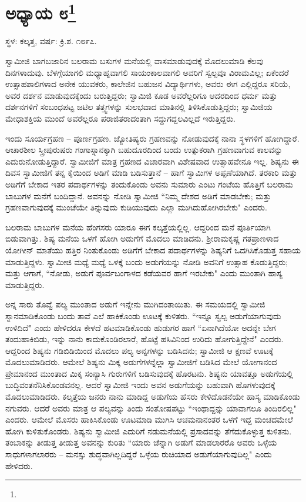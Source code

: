 \newpage

\chapter[ಅಧ್ಯಾಯ ೮]{ಅಧ್ಯಾಯ ೮\protect\footnote{}}

\centerline{ಸ್ಥಳ: ಕಲ್ಕತ್ತ, ವರ್ಷ: ಕ್ರಿ.ಶ. ೧೮೯೭.}

ಸ್ವಾಮೀಜಿ ಬಾಗಬಜಾರಿನ ಬಲರಾಮ ಬಸುಗಳ ಮನೆಯಲ್ಲಿ ವಾಸಮಾಡುವುದಕ್ಕೆ ಮೊದಲುಮಾಡಿ ಕೆಲವು ದಿನಗಳಾದುವು. ಬೆಳಗ್ಗೆಯಾಗಲಿ ಮಧ್ಯಾಹ್ನವಾಗಲಿ ಸಾಯಂಕಾಲವಾಗಲಿ ಅವರಿಗೆ ಸ್ವಲ್ಪವೂ ವಿರಾಮವಿಲ್ಲ; ಏಕೆಂದರೆ ಉತ್ಸಾಹಶಾಲಿಗಳಾದ ಅನೇಕ ಯುವಕರು, ಕಾಲೇಜಿನ ಬಹುಜನ ವಿದ್ಯಾರ್ಥಿಗಳು, ಅವರು ಈಗ ಎಲ್ಲಿದ್ದರೂ ಸರಿಯೆ, ಅವರ ದರ್ಶನ ಮಾಡುವುದಕ್ಕೆಂದು ಬರುತ್ತಿದ್ದರು; ಸ್ವಾಮಿಜಿ ಕೂಡ ಅವರೆಲ್ಲರಿಗೂ ಆದರದಿಂದ ಧರ್ಮ ಮತ್ತು ದರ್ಶನಗಳಿಗೆ ಸಂಬಂಧಪಟ್ಟ ಜಟಿಲ ತತ್ತ್ವಗಳನ್ನು ಸುಲಭವಾದ ಮಾತಿನಲ್ಲಿ ತಿಳಿಸಿಕೊಡುತ್ತಿದ್ದರು; ಸ್ವಾಮಿಜಿಯ ಮೇಧಾಶಕ್ತಿಯ ಮುಂದೆ ಅವರೆಲ್ಲರೂ ಪರಾಜಿತರಾದಂತಾಗಿ ಸದ್ದುಗದ್ದಲವಿಲ್ಲದೆ ಇರುತ್ತಿದ್ದರು.

ಇಂದು ಸೂರ್ಯಗ್ರಹಣ – ಪೂರ್ಣಗ್ರಹಣ. ಜ್ಯೋತಿಷ್ಯರು ಗ್ರಹಣವನ್ನು ನೋಡುವುದಕ್ಕೆ ನಾನಾ ಸ್ಥಳಗಳಿಗೆ ಹೋಗಿದ್ದಾರೆ. ಆಚಾರಶೀಲ ಸ್ತ್ರೀಪುರುಷರು ಗಂಗಾಸ್ನಾನಕ್ಕಾಗಿ ಬಹುದೂರದಿಂದ ಬಂದು ಉತ್ಸುಕರಾಗಿ ಗ್ರಹಣವಾಗುವ ಕಾಲವನ್ನು ಎದುರುನೋಡುತ್ತಿದ್ದಾರೆ. ಸ್ವಾಮೀಜಿಗೆ ಮಾತ್ರ ಗ್ರಹಣದ ವಿಚಾರವಾಗಿ ವಿಶೇಷವಾದ ಉತ್ಸಾಹವೇನೂ ಇಲ್ಲ. ಶಿಷ್ಯನು ಈ ದಿವಸ ಸ್ವಾಮೀಜಿಗೆ ತನ್ನ ಕೈಯಿಂದ ಅಡಿಗೆ ಮಾಡಿ ಬಡಿಸುತ್ತಾನೆ – ಹಾಗೆ ಸ್ವಾಮಿಗಳ ಅಪ್ಪಣೆಯಾಗಿದೆ. ತರಕಾರಿ ಮತ್ತು ಅಡಿಗೆಗೆ ಬೇಕಾದ ಇತರ ಪದಾರ್ಥಗಳನ್ನು ತಂದುಕೊಂಡು ಅವನು ಸುಮಾರು ಎಂಟು ಗಂಟೆಯ ಹೊತ್ತಿಗೆ ಬಲರಾಮ ಬಾಬುಗಳ ಮನೆಗೆ ಬಂದಿದ್ದಾನೆ. ಅವನನ್ನು ನೋಡಿ ಸ್ವಾಮೀಜಿ “ನಿಮ್ಮ ದೇಶದ ಅಡಿಗೆ ಮಾಡಬೇಕು; ಮತ್ತು ಗ್ರಹಣವಾಗುವುದಕ್ಕೆ ಮುಂಚೆಯೇ ತಿನ್ನುವುದು ಕುಡಿಯುವುದು ಎಲ್ಲಾ ಮುಗಿದುಹೋಗಿರಬೇಕು" ಎಂದರು.

ಬಲರಾಮ ಬಾಬುಗಳ ಮನೆಯ ಹೆಂಗಸರು ಯಾರೂ ಈಗ ಕಲ್ಕತ್ತೆಯಲ್ಲಿಲ್ಲ. ಆದ್ದರಿಂದ ಮನೆ ಪೂರ್ತಿಯಾಗಿ ಬಿಡುವಾಗಿತ್ತು. ಶಿಷ್ಯ ಮನೆಯ ಒಳಗೆ ಹೋಗಿ ಅಡುಗೆಗೆ ಮೊದಲು ಮಾಡಿದನು. ಶ‍್ರೀರಾಮಕೃಷ್ಣ ಗತಪ್ರಾಣಳಾದ ಯೋಗೀನ್ ಮಾತೆಯು ಹತ್ತಿರ ನಿಂತುಕೊಂಡು ಅಡಿಗೆಗೆ ಬೇಕಾದ ಪದಾರ್ಥಗಳನ್ನು ಶಿಷ್ಯನಿಗೆ ಒದಗಿಸಿಕೊಡುತ್ತ ಸಹಾಯ ಮಾಡುತ್ತಿದ್ದಳು. ಸ್ವಾಮೀಜಿ ಮಧ್ಯೆ ಮಧ್ಯೆ ಒಳಕ್ಕೆ ಬಂದು ಅಡುಗೆಯನ್ನು ನೋಡಿ ಅವನಿಗೆ ಉತ್ಸಾಹ ಕೊಡುತ್ತಿದ್ದರು; ಮತ್ತು ಆಗಾಗೆ, “ನೋಡು, ಅಡುಗೆ ಪೂರ್ವಬಂಗಾಳದ ಕಡೆಯವರ ಹಾಗೆ ಇರಬೇಕು" ಎಂದು ಮುಂತಾಗಿ ಹಾಸ್ಯ ಮಾಡುತ್ತಿದ್ದರು.

ಅನ್ನ ಸಾರು ತೊವ್ವೆ ಪಲ್ಯ ಮುಂತಾದ ಅಡುಗೆ ಇನ್ನೇನು ಮುಗಿದಂತಾಯಿತು. ಈ ಸಮಯದಲ್ಲಿ ಸ್ವಾಮೀಜಿ ಸ್ನಾನಮಾಡಿಕೊಂಡು ಬಂದು ತಾವೆ ಎಲೆ ಹಾಕಿಕೊಂಡು ಊಟಕ್ಕೆ ಕುಳಿತರು. “ಇನ್ನೂ ಸ್ವಲ್ಪ ಅಡುಗೆಯಾಗುವುದು ಉಳಿದಿದೆ" ಎಂದು ಹೇಳಿದರೂ ಕೇಳದೆ ಹಟಮಾಡಿಕೊಂಡು ಹುಡುಗರ ಹಾಗೆ “ಏನಾಗಿದೆಯೋ ಅದನ್ನೇ ಬೇಗ ತಂದುಹಾಕಿಬಿಡು, ಇನ್ನು ನಾನು ಕಾದುಕೊಂಡಿರಲಾರೆ, ಹೊಟ್ಟೆ ಹಸಿವಿನಿಂದ ಉರಿದು ಹೋಗುತ್ತಿದ್ದೇನೆ" ಎಂದರು. ಆದ್ದರಿಂದ ಶಿಷ್ಯನು ಗಡಿಬಿಡಿಯಿಂದ ಮೊದಲು ಪಲ್ಯ ಅನ್ನಗಳನ್ನು ಬಡಿಸಿದನು; ಸ್ವಾಮೀಜಿ ಆ ಕ್ಷಣವೆ ಊಟಕ್ಕೆ ಮೊದಲುಮಾಡಿದರು. ಆಮೇಲೆ ಶಿಷ್ಯನು ಮಿಕ್ಕ ಅಡುಗೆಗಳನ್ನೆಲ್ಲಾ ಸ್ವಾಮೀಜಿಗೆ ಬಡಿಸಿದ ಮೇಲೆ ಯೋಗಾನಂದ ಪ್ರೇಮಾನಂದ ಮುಂತಾದ ಮಿಕ್ಕ ಸಂನ್ಯಾಸಿ ಗುರುಗಳಿಗೆ ಬಡಿಸುವುದಕ್ಕೆ ಹೊರಟನು. ಶಿಷ್ಯನು ಯಾವತ್ತೂ ಅಡುಗೆಯಲ್ಲಿ ಬುದ್ಧಿವಂತನೆನಿಸಿಕೊಂಡವನಲ್ಲ. ಆದರೆ ಸ್ವಾಮೀಜಿ ಇಂದು ಅವನ ಅಡುಗೆಯನ್ನು ಬಹುವಾಗಿ ಹೊಗಳುವುದಕ್ಕೆ ಮೊದಲುಮಾಡಿದರು. ಕಲ್ಕತ್ತೆಯ ಜನರು ನಾನು ಮಾಡಿದ್ದ ಅಡುಗೆಯ ಹೆಸರು ಕೇಳಿದೊಡನೆಯೇ ಹಾಸ್ಯ ಮಾಡಿಕೊಂಡು ನಗುವರು. ಆದರೆ ಅವರು ಮಾತ್ರ ಆ ಪಲ್ಯವನ್ನು ತಿಂದು ಸಂತೋಷಪಟ್ಟು “ಇಂಥಾದ್ದನ್ನು ಯಾವಾಗಲೂ ತಿಂದಿರಲಿಲ್ಲ" ಎಂದರು. ಆಮೇಲೆ ಮೊಸರು ಹಾಕಿಸಿಕೊಂಡು ಊಟಮಾಡಿ ಮುಗಿಸಿ ಆಚಮನಾನಂತರ ಒಳಗೆ ಇದ್ದ ಮಂಚದಮೇಲೆ ಹೋಗಿ ಕುಳಿತುಕೊಂಡರು. ಶಿಷ್ಯನು ಸ್ವಾಮೀಜಿ ಎದುರಿಗೆ ನಡುಮನೆಯಲ್ಲಿ ಪ್ರಸಾದವನ್ನು ತೆಗೆದುಕೊಳ್ಳುತ್ತ ಕುಳಿತನು. ತಂಬಾಕನ್ನು ತೀಡುತ್ತ ತೀಡುತ್ತ ಅವನನ್ನು ಕುರಿತು “ಯಾರು ಚೆನ್ನಾಗಿ ಅಡುಗೆ ಮಾಡಲಾರರೊ ಅವರು ಒಳ್ಳೆಯ ಸಾಧುಗಳಾಗಲಾರರು – ಮನಸ್ಸು ಶುದ್ಧವಾಗಿಲ್ಲದಿದ್ದರೆ ಒಳ್ಳೆಯ ರುಚಿಯಾದ ಅಡುಗೆಯಾಗುವುದಿಲ್ಲ" ಎಂದು ಹೇಳಿದರು.

